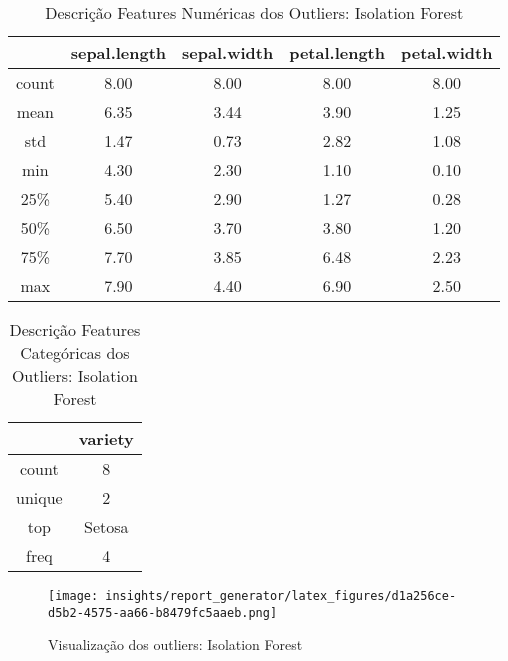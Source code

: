 \documentclass{article}%
\begin{document}
\begin{table}[htbp]%
\caption{Descrição Features Numéricas dos Outliers: Isolation Forest}%
\centering%
\begin{tabular}{ccccc}
\toprule
{} &  sepal.length &  sepal.width &  petal.length &  petal.width \\
\midrule
count &          8.00 &         8.00 &          8.00 &         8.00 \\
mean  &          6.35 &         3.44 &          3.90 &         1.25 \\
std   &          1.47 &         0.73 &          2.82 &         1.08 \\
min   &          4.30 &         2.30 &          1.10 &         0.10 \\
25\%   &          5.40 &         2.90 &          1.27 &         0.28 \\
50\%   &          6.50 &         3.70 &          3.80 &         1.20 \\
75\%   &          7.70 &         3.85 &          6.48 &         2.23 \\
max   &          7.90 &         4.40 &          6.90 &         2.50 \\
\bottomrule
\end{tabular}
%
\label{tab:numerical1}%
\end{table}

%


\begin{table}[htbp]%
\caption{Descrição Features Categóricas dos Outliers: Isolation Forest}%
\centering%
\begin{tabular}{cc}
\toprule
{} & variety \\
\midrule
count  &       8 \\
unique &       2 \\
top    &  Setosa \\
freq   &       4 \\
\bottomrule
\end{tabular}
%
\label{tab:categorical1}%
\end{table}

%


\begin{figure}%
\centering%
\texttt{[image: insights/report\_generator/latex\_figures/d1a256ce-d5b2-4575-aa66-b8479fc5aaeb.png]}%
\caption{Visualização dos outliers: Isolation Forest}%
\label{fig:outliers1}%
\end{figure}

%
\FloatBarrier%
\clearpage%
\end{document}
